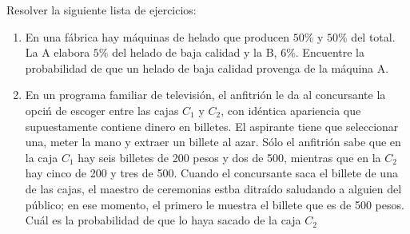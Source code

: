 \begin{Ejer} Resolver la siguiente lista de ejercicios:
\begin{enumerate}

\item En una f\'abrica hay m\'aquinas de helado que producen $50\%$ y $50\%$ del total.  La A elabora $5\%$ del helado de baja calidad y la B, $6\%$. Encuentre la probabilidad de que un helado de baja calidad provenga de la m\'aquina A.

\item En un programa familiar de televisi\'on, el anfitri\'on le da al concursante la opci\'n de escoger entre las cajas $C_{1}$ y $C_{2}$, con id\'entica apariencia que supuestamente contiene dinero en billetes. El aspirante tiene que seleccionar una, meter la mano y extraer un billete al azar. S\'olo el anfitri\'on sabe que en la caja $C_{1}$ hay seis billetes de 200 pesos y dos de 500, mientras que en la $C_{2}$ hay cinco de 200 y tres de 500. Cuando el concursante saca el billete de una de las cajas, el maestro de ceremonias estba ditra\'ido saludando a alguien del p\'ublico; en ese momento, el primero le muestra el billete que es de 500 pesos. Cu\'al es la probabilidad de que lo haya sacado de la caja $C_{2}$
\end{enumerate}


\end{Ejer}




